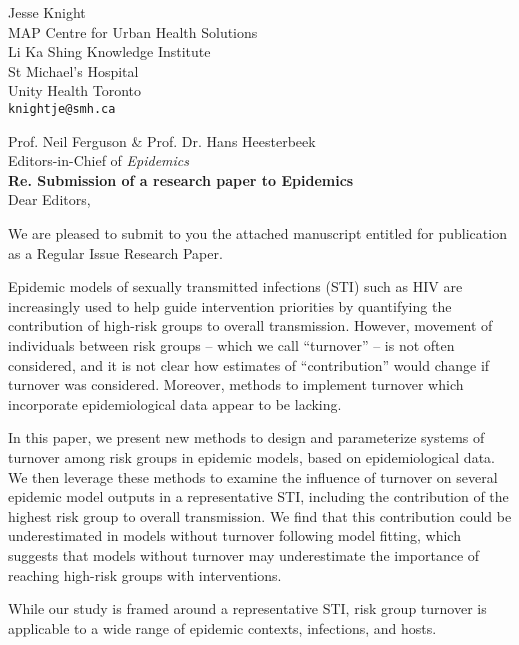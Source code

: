 \documentclass[a4]{article}
\begin{document}
\begin{flushright}
Jesse Knight\\
MAP Centre for Urban Health Solutions\\
Li Ka Shing Knowledge Institute\\
St Michael's Hospital\\
Unity Health Toronto\\
\texttt{knightje@smh.ca}\\[1em]
\end{flushright}
Prof. Neil Ferguson \& Prof. Dr. Hans Heesterbeek\\
Editors-in-Chief of \textit{Epidemics}\\[1em]
\textbf{Re. Submission of a research paper to Epidemics}\\[1em]
Dear Editors,
\par
We are pleased to submit to you the attached manuscript entitled
\textit{}%
for publication as a Regular Issue Research Paper.
\par
Epidemic models of sexually transmitted infections (STI) such as HIV
are increasingly used to help guide intervention priorities
by quantifying the contribution of high-risk groups to overall transmission.
However, movement of individuals between risk groups
-- which we call ``turnover'' --
is not often considered, and it is not clear how
estimates of ``contribution'' would change if turnover was considered.
Moreover, methods to implement turnover which incorporate epidemiological data
appear to be lacking.
\par
In this paper, we present new methods to design and parameterize
systems of turnover among risk groups in epidemic models,
based on epidemiological data.
We then leverage these methods to examine the influence of turnover
on several epidemic model outputs in a representative STI,
including the contribution of the highest risk group to overall transmission.
We find that this contribution could be underestimated in models without turnover
following model fitting,
which suggests that models without turnover may underestimate
the importance of reaching high-risk groups with interventions.
\par
While our study is framed around a representative STI,
risk group turnover is applicable to a wide range of 
epidemic contexts, infections, and hosts.
\end{document}

